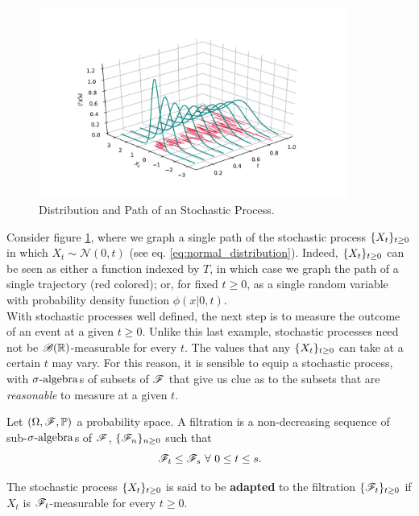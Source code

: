 \documentclass[../TGMAFFIRO.tex]{subfiles}
\begin{document}
\begin{figure}[h]
	\centering
	\includegraphics[width=0.90\textwidth]{images/stoch_process_3d}
	\caption{Distribution and Path of an Stochastic Process.}
	\label{fig:stochastic_process}
\end{figure}

Consider figure \ref{fig:stochastic_process}, where we graph a single path of the stochastic process $\{X_t\}_{t\geq 0}$ in which $X_t \sim \mathcal{N}(0, t)$ (see eq. \ref{eq:normal_distribution}). Indeed, $\{X_t\}_{t\geq 0}$ can be seen as either a function indexed by $T$, in which case we graph the path of a single trajectory (red colored); or, for fixed $t\geq 0$, as a single random variable with probability density function $\phi(x | 0, t)$.\\

With stochastic processes well defined, the next step is to measure the outcome of an event at a given $t \geq 0$. Unlike this last example, stochastic processes need not be $\mathscr{B}(\mathbb{R})$-measurable for every $t$. The values that any $\{X_t\}_{t\geq 0}$ can take at a certain $t$ may vary. For this reason, it is sensible to equip a stochastic process, with $\sigma\text{-algebra}$s of subsets of $\mathscr{F}$ that give us clue as to the subsets that are \textit{reasonable} to measure at a given $t$. 

\begin{definition}
Let $(\Omega, \mathscr{F}, \mathbb{P})$ a probability space. A filtration is a non-decreasing sequence of sub-$\sigma\text{-algebra}$s of $\mathscr{F}$, $\{\mathscr{F}_n\}_{n\geq 0}$ such that 
\[
	\mathscr{F}_t \leq \mathscr{F}_s \ \forall \ 0 \leq t \leq s.
\]
\end{definition}

The stochastic process $\{X_t\}_{t\geq 0}$ is said to be \textbf{adapted} to the filtration $\{\mathscr{F}_t\}_{t\geq 0}$ if $X_t$ is $\mathscr{F}_t$-measurable for every $t\geq 0$.\\
\end{document}
